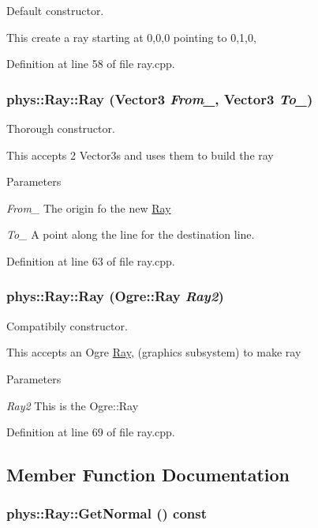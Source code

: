 Default constructor. 

This create a ray starting at 0,0,0 pointing to 0,1,0, 

Definition at line 58 of file ray.cpp.

\hypertarget{classphys_1_1Ray_aa6123ef37a2351e6cca3954c23212379}{
\subsubsection[{Ray}]{\setlength{\rightskip}{0pt plus 5cm}phys::Ray::Ray ({\bf Vector3} {\em From\_\-}, \/  {\bf Vector3} {\em To\_\-})}}
\label{df/d57/classphys_1_1Ray_aa6123ef37a2351e6cca3954c23212379}


Thorough constructor. 

This accepts 2 Vector3s and uses them to build the ray 
\begin{DoxyParams}{Parameters}
\item[{\em From\_\-}]The origin fo the new \hyperlink{classphys_1_1Ray}{Ray} \item[{\em To\_\-}]A point along the line for the destination line. \end{DoxyParams}


Definition at line 63 of file ray.cpp.

\hypertarget{classphys_1_1Ray_a395485ffe19e6a53966730c01a2781c1}{
\subsubsection[{Ray}]{\setlength{\rightskip}{0pt plus 5cm}phys::Ray::Ray (Ogre::Ray {\em Ray2})}}
\label{df/d57/classphys_1_1Ray_a395485ffe19e6a53966730c01a2781c1}


Compatibily constructor. 

This accepts an Ogre \hyperlink{classphys_1_1Ray}{Ray}, (graphics subsystem) to make ray 
\begin{DoxyParams}{Parameters}
\item[{\em Ray2}]This is the Ogre::Ray \end{DoxyParams}


Definition at line 69 of file ray.cpp.



\subsection{Member Function Documentation}
\hypertarget{classphys_1_1Ray_a7445c25acb6ce865ef85e7ada829ccba}{
\subsubsection[{GetNormal}]{ phys::Ray::GetNormal () const}}
\label{df/d57/classphys_1_1Ray_a7445c25acb6ce865ef85e7ada829ccba}


